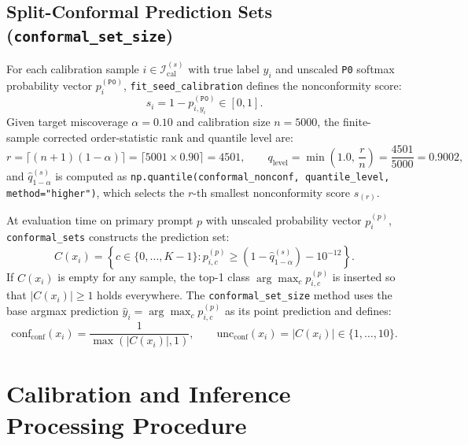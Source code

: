 \documentclass[11pt,a4paper]{article}
\begin{document}
\subsection{Split-Conformal Prediction Sets (\texttt{conformal\_\allowbreak{}set\_\allowbreak{}size})}

For each calibration sample $i \in \mathcal{I}_{\text{cal}}^{(s)}$ with true label $y_i$ and unscaled \texttt{P0} softmax probability vector $p_i^{(\texttt{P0})}$, \texttt{fit\_\allowbreak{}seed\_\allowbreak{}calibration} defines the nonconformity score:
\begin{equation}
  s_i = 1 - p_{i, y_i}^{(\texttt{P0})} \in [0, 1].
\end{equation}
Given target miscoverage $\alpha = 0.10$ and calibration size $n = 5000$, the finite-sample corrected order-statistic rank and quantile level are:
\begin{equation}
  r = \lceil (n + 1)(1 - \alpha) \rceil = \lceil 5001 \times 0.90 \rceil = 4501, \qquad
  q_{\text{level}} = \min\!\left(1.0, \, \frac{r}{n}\right) = \frac{4501}{5000} = 0.9002,
\end{equation}
and $\hat{q}_{1-\alpha}^{(s)}$ is computed as \texttt{np.\allowbreak{}quantile(\allowbreak{}conformal\_\allowbreak{}nonconf,\allowbreak{} quantile\_\allowbreak{}level,\allowbreak{} method="higher")}, which selects the $r$-th smallest nonconformity score $s_{(r)}$.

At evaluation time on primary prompt $p$ with unscaled probability vector $p_i^{(p)}$, \texttt{conformal\_\allowbreak{}sets} constructs the prediction set:
\begin{equation}
  C(x_i) = \left\{ c \in \{0, \dots, K-1\} : p_{i,c}^{(p)} \ge (1 - \hat{q}_{1-\alpha}^{(s)}) - 10^{-12} \right\}.
\end{equation}
If $C(x_i)$ is empty for any sample, the top-1 class $\arg\max_{c} p_{i,c}^{(p)}$ is inserted so that $|C(x_i)| \ge 1$ holds everywhere. The \texttt{conformal\_\allowbreak{}set\_\allowbreak{}size} method uses the base argmax prediction $\hat{y}_i = \arg\max_c p_{i,c}^{(p)}$ as its point prediction and defines:
\begin{equation}
  \text{conf}_{\text{conf}}(x_i) = \frac{1}{\max(|C(x_i)|, 1)}, \qquad
  \text{unc}_{\text{conf}}(x_i) = |C(x_i)| \in \{1, \dots, 10\}.
\end{equation}

\section{Calibration and Inference Processing Procedure}
\end{document}
